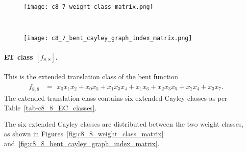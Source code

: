\documentclass[12pt,a4paper]{article}
\begin{document}
\begin{figure}[!bhpt] %
\centering
\begin{minipage}{.48\textwidth}
  \centering
  \texttt{[image: c8\_7\_weight\_class\_matrix.png]}
  \label{fig:c8_7_weight_class_matrix}
\end{minipage}%
~~~~
\begin{minipage}{.48\textwidth}
  \centering
  \texttt{[image: c8\_7\_bent\_cayley\_graph\_index\_matrix.png]}
  \label{fig:c8_7_bent_cayley_graph_index_matrix}
\end{minipage}
\end{figure}

\paragraph*{ET class $[f_{8,8}]$.}
%
This is the extended translation class of the bent function
\small{}
\begin{align*}
f_{ 8 , 8 } &=
\begin{array}{l}
x_{0} x_{1} x_{2} + x_{0} x_{5} + x_{1} x_{3} x_{4} + x_{1} x_{6} + x_{2} x_{3} x_{5} + x_{2} x_{4}
+ x_{3} x_{7}.
\end{array}
\end{align*}
\normalsize{}
The extended translation class contains six extended Cayley classes as per Table~\ref{tab-c8_8_EC_classes}.

The six extended Cayley classes are distributed between the two weight classes,
as shown in Figures~\ref{fig:c8_8_weight_class_matrix} and~\ref{fig:c8_8_bent_cayley_graph_index_matrix}.
\end{document}
